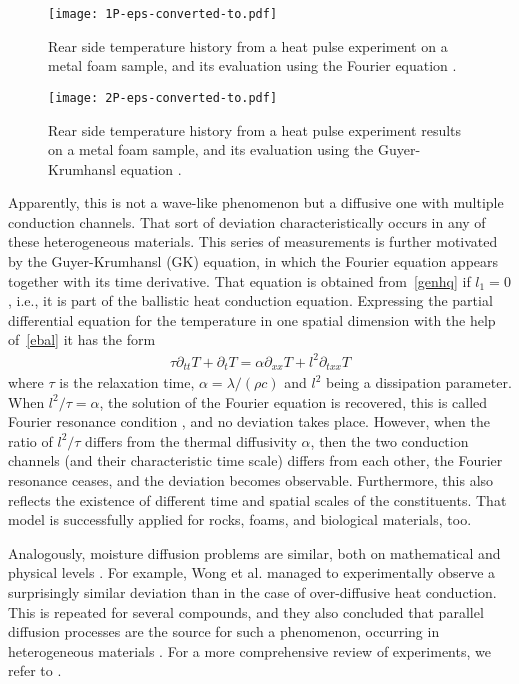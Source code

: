 \documentclass[sn-mathphys]{sn-jnl}%
\theoremstyle{thmstyleone}%
\theoremstyle{thmstyletwo}%
\theoremstyle{thmstylethree}%
\begin{document}
{\begin{figure}
	\centering
	\hspace{-1.4cm}
	\texttt{[image: 1P-eps-converted-to.pdf]}
	\caption{Rear side temperature history from a heat pulse experiment on a metal foam sample, and its evaluation using the Fourier equation \cite{myphd2017}.}
	\label{Fig:res1}
\end{figure}

\begin{figure}
	\hspace{-0.6cm}
	\centering
	\texttt{[image: 2P-eps-converted-to.pdf]}
	\caption {Rear side temperature history from a heat pulse experiment results on a metal foam sample, and its evaluation using the Guyer-Krumhansl equation \cite{myphd2017}.}
	\label{Fig:res2}
\end{figure}

Apparently, this is not a wave-like phenomenon but a diffusive one with multiple conduction channels. That sort of deviation characteristically occurs in any of these heterogeneous materials. This series of measurements is further motivated by the Guyer-Krumhansl (GK) equation, in which the Fourier equation appears together with its time derivative. {That equation is obtained from~\eqref{genhq} if $l_1=0$, i.e., it is part of the ballistic heat conduction equation. Expressing the partial differential equation for the temperature in one spatial dimension with the help of~\eqref{ebal} it has the form
	\begin{align}
		\tau \partial_{tt} T + \partial_t T = \alpha \partial_{xx} T + l^2 \partial_{txx} T \label{GKtemp}
	\end{align}
	where $\tau$ is the relaxation time, $\alpha= \lambda/(\rho c)$ and $l^2$ being a dissipation parameter.} When $l^2/\tau=\alpha$, the solution of the Fourier equation is recovered, this is called Fourier resonance condition \cite{VanKovFul15}, and no deviation takes place. However, when the ratio of $l^2/\tau$ differs from the thermal diffusivity $\alpha$, then the two conduction channels (and their characteristic time scale) differs from each other, the Fourier resonance ceases, and the deviation becomes observable. Furthermore, this also reflects the existence of different time and spatial scales of the constituents. That model is successfully applied for rocks, foams, and biological materials, too. 

Analogously, moisture diffusion problems are similar, both on mathematical and physical levels \cite{Brinkman49, DurBra87}. For example, Wong et al. \cite{WongEtal99} managed to experimentally observe a surprisingly similar deviation than in the case of over-diffusive heat conduction. This is repeated for several compounds, and they also concluded that parallel diffusion processes are the source for such a phenomenon, occurring in heterogeneous materials \cite{KeeEtal05}. For a more comprehensive review of experiments, we refer to \cite{JozsKov20b, Mail2019}.

}
\end{document}
